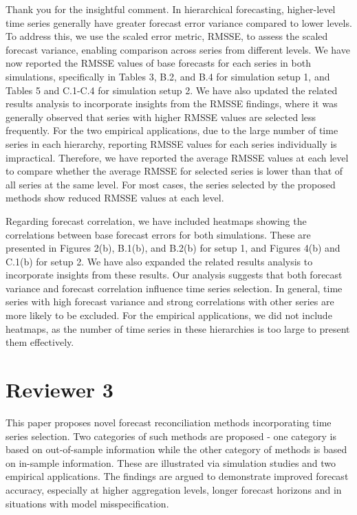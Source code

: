 \documentclass[11pt,a4paper,]{article}
\renewenvironment{quote}
               {\list{}{\rightmargin\leftmargin}%
                \item\relax\color[RGB]{0,150,0}}
               {\endlist}
\begin{document}
\begin{quote}
Thank you for the insightful comment. In hierarchical forecasting,
higher-level time series generally have greater forecast error variance
compared to lower levels. To address this, we use the scaled error
metric, RMSSE, to assess the scaled forecast variance, enabling
comparison across series from different levels. We have now reported the
RMSSE values of base forecasts for each series in both simulations,
specifically in Tables 3, B.2, and B.4 for simulation setup 1, and
Tables 5 and C.1-C.4 for simulation setup 2. We have also updated the
related results analysis to incorporate insights from the RMSSE
findings, where it was generally observed that series with higher RMSSE
values are selected less frequently. For the two empirical applications,
due to the large number of time series in each hierarchy, reporting
RMSSE values for each series individually is impractical. Therefore, we
have reported the average RMSSE values at each level to compare whether
the average RMSSE for selected series is lower than that of all series
at the same level. For most cases, the series selected by the proposed
methods show reduced RMSSE values at each level.

Regarding forecast correlation, we have included heatmaps showing the
correlations between base forecast errors for both simulations. These
are presented in Figures 2(b), B.1(b), and B.2(b) for setup 1, and
Figures 4(b) and C.1(b) for setup 2. We have also expanded the related
results analysis to incorporate insights from these results. Our
analysis suggests that both forecast variance and forecast correlation
influence time series selection. In general, time series with high
forecast variance and strong correlations with other series are more
likely to be excluded. For the empirical applications, we did not
include heatmaps, as the number of time series in these hierarchies is
too large to present them effectively.
\end{quote}

\section*{Reviewer 3}\label{reviewer-3}

This paper proposes novel forecast reconciliation methods incorporating
time series selection. Two categories of such methods are proposed - one
category is based on out-of-sample information while the other category
of methods is based on in-sample information. These are illustrated via
simulation studies and two empirical applications. The findings are
argued to demonstrate improved forecast accuracy, especially at higher
aggregation levels, longer forecast horizons and in situations with
model misspecification.
\end{document}
